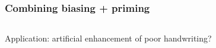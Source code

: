 \documentclass[10pt,xcolor=dvipsnames]{beamer}
\begin{document}
\begin{frame}
  \frametitle{Combining biasing + priming}
 \begin{columns}
   \begin{column}{.5\textwidth}
   \end{column}

   \begin{column}{.5\textwidth}
   \end{column}
 \end{columns} 
 Application: artificial enhancement of poor handwriting?
\end{frame}
\end{document}
